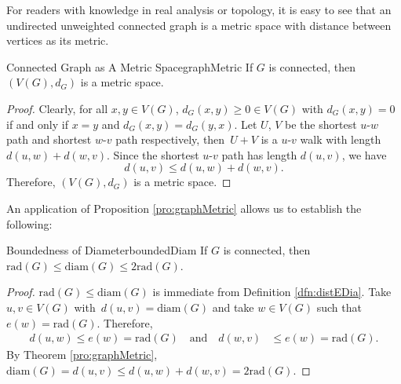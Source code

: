 \documentclass[math]{amznotes}
\theoremstyle{remark}
\begin{document}
For readers with knowledge in real analysis or topology, it is easy to see that an undirected unweighted connected graph is a metric space with distance between vertices as its metric. 
\begin{probox}{Connected Graph as A Metric Space}{graphMetric}
    If $G$ is connected, then $(V(G), d_G)$ is a metric space.
    \tcblower   
    \begin{proof}
        Clearly, for all $x, y \in V(G)$, $d_G(x, y) \geq 0 \in V(G)$ with $d_G(x, y) = 0$ if and only if $x = y$ and $d_G(x, y) = d_G(y, x)$. Let $U$, $V$ be the shortest $u$-$w$ path and shortest $w$-$v$ path respectively, then~$U + V$ is a $u$-$v$ walk with length $d(u, w) + d(w, v)$. Since the shortest $u$-$v$ path has length $d(u, v)$, we have
        \begin{equation*}
            d(u, v) \leq d(u, w) + d(w, v).
        \end{equation*}
        Therefore, $(V(G), d_G)$ is a metric space.
    \end{proof}
\end{probox}
An application of Proposition \ref{pro:graphMetric} allows us to establish the following:
\begin{probox}{Boundedness of Diameter}{boundedDiam}
    If $G$ is connected, then $\mathrm{rad}(G) \leq \mathrm{diam}(G) \leq 2\mathrm{rad}(G)$.
    \tcblower
    \begin{proof}
        $\mathrm{rad}(G) \leq \mathrm{diam}(G)$ is immediate from Definition \ref{dfn:distEDia}. Take $u, v \in V(G)$ with~$d(u, v) = \mathrm{diam}(G)$ and take $w \in V(G)$ such that $e(w) = \mathrm{rad}(G)$. Therefore,
        \begin{align*}
            d(u, w) \leq e(w) = \mathrm{rad}(G) \quad\textrm{and} \quad d(w, v) & \leq e(w) = \mathrm{rad}(G).
        \end{align*}
        By Theorem \ref{pro:graphMetric}, $\mathrm{diam}(G) = d(u, v) \leq d(u, w) + d(w, v) = 2\mathrm{rad}(G)$.
    \end{proof}
\end{probox}
\end{document}
